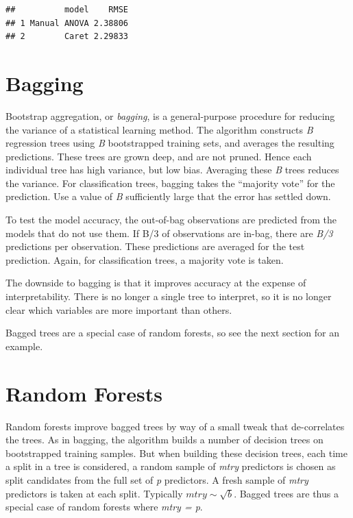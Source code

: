 \documentclass[]{book}
\begin{document}
\begin{verbatim}
##          model    RMSE
## 1 Manual ANOVA 2.38806
## 2        Caret 2.29833
\end{verbatim}

\hypertarget{bagging}{%
\section{Bagging}\label{bagging}}

Bootstrap aggregation, or \emph{bagging}, is a general-purpose procedure for reducing the variance of a statistical learning method. The algorithm constructs \emph{B} regression trees using \emph{B} bootstrapped training sets, and averages the resulting predictions. These trees are grown deep, and are not pruned. Hence each individual tree has high variance, but low bias. Averaging these \emph{B} trees reduces the variance. For classification trees, bagging takes the ``majority vote'' for the prediction. Use a value of \emph{B} sufficiently large that the error has settled down.

To test the model accuracy, the out-of-bag observations are predicted from the models that do not use them. If B/3 of observations are in-bag, there are \emph{B/3} predictions per observation. These predictions are averaged for the test prediction. Again, for classification trees, a majority vote is taken.

The downside to bagging is that it improves accuracy at the expense of interpretability. There is no longer a single tree to interpret, so it is no longer clear which variables are more important than others.

Bagged trees are a special case of random forests, so see the next section for an example.

\hypertarget{random-forests}{%
\section{Random Forests}\label{random-forests}}

Random forests improve bagged trees by way of a small tweak that de-correlates the trees. As in bagging, the algorithm builds a number of decision trees on bootstrapped training samples. But when building these decision trees, each time a split in a tree is considered, a random sample of \emph{mtry} predictors is chosen as split candidates from the full set of \emph{p} predictors. A fresh sample of \emph{mtry} predictors is taken at each split. Typically \(mtry \sim \sqrt{b}\). Bagged trees are thus a special case of random forests where \emph{mtry = p}.
\end{document}
